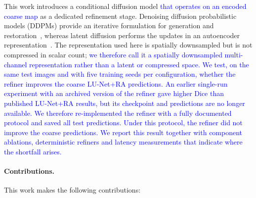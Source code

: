 \documentclass[jimaging,article,submit,pdftex,moreauthors]
  {Definitions/mdpi}
\DeclareRobustCommand{\rev}[1]{\textcolor{blue}{#1}}
\DeclareRobustCommand{\rev}[1]{#1}
\providecommand{\linelabel}[1]{}
\begin{document}
This work introduces a conditional diffusion model \rev{that operates on an encoded coarse map} as a dedicated refinement stage. Denoising diffusion probabilistic models (DDPMs) provide an iterative formulation for generation and restoration~\cite{Ho2020,Dhariwal2021}, whereas latent diffusion performs the updates in an autoencoder representation~\cite{Rombach2022}. The representation used here is spatially downsampled but is not compressed in scalar count; \rev{we therefore call it a spatially downsampled multi-channel representation rather than a latent or compressed space. We test, on the same test images and with five training seeds per configuration, whether the refiner improves the coarse LU-Net+RA predictions. An earlier single-run experiment with an archived version of the refiner gave higher Dice than published LU-Net+RA results, but its checkpoint and predictions are no longer available. We therefore re-implemented the refiner with a fully documented protocol and saved all test predictions. Under this protocol, the refiner did not improve the coarse predictions. We report this result together with component ablations, deterministic refiners and latency measurements that indicate where the shortfall arises.}\linelabel{rev:intro:representation}

\paragraph{Contributions.}
This work makes the following contributions:
\end{document}
